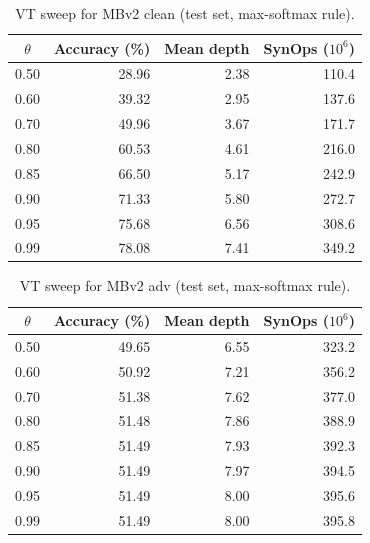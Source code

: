 \begin{table}[htbp]
\centering
\caption{VT sweep for MBv2 clean (test set, max-softmax rule).}
\label{tab:app-vt-mbv2_clean_T8}
\footnotesize
\begin{tabular}{@{}c r r r@{}}
\toprule
$\theta$ & Accuracy (\%) & Mean depth & SynOps ($10^6$) \\
\midrule
0.50 & 28.96 & 2.38 & 110.4 \\
0.60 & 39.32 & 2.95 & 137.6 \\
0.70 & 49.96 & 3.67 & 171.7 \\
0.80 & 60.53 & 4.61 & 216.0 \\
0.85 & 66.50 & 5.17 & 242.9 \\
0.90 & 71.33 & 5.80 & 272.7 \\
0.95 & 75.68 & 6.56 & 308.6 \\
0.99 & 78.08 & 7.41 & 349.2 \\
\bottomrule
\end{tabular}
\end{table}

\begin{table}[htbp]
\centering
\caption{VT sweep for MBv2 adv (test set, max-softmax rule).}
\label{tab:app-vt-mbv2_adv_T8}
\footnotesize
\begin{tabular}{@{}c r r r@{}}
\toprule
$\theta$ & Accuracy (\%) & Mean depth & SynOps ($10^6$) \\
\midrule
0.50 & 49.65 & 6.55 & 323.2 \\
0.60 & 50.92 & 7.21 & 356.2 \\
0.70 & 51.38 & 7.62 & 377.0 \\
0.80 & 51.48 & 7.86 & 388.9 \\
0.85 & 51.49 & 7.93 & 392.3 \\
0.90 & 51.49 & 7.97 & 394.5 \\
0.95 & 51.49 & 8.00 & 395.6 \\
0.99 & 51.49 & 8.00 & 395.8 \\
\bottomrule
\end{tabular}
\end{table}

